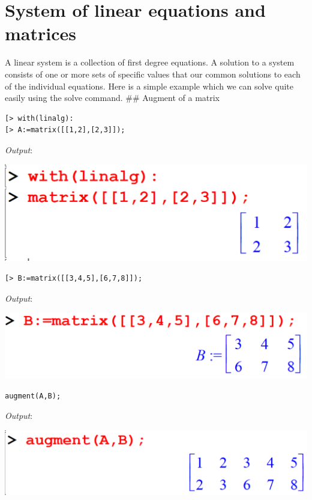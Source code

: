\documentclass[
]{book}
\theoremstyle{definition}
\theoremstyle{definition}
\theoremstyle{definition}
\theoremstyle{definition}
\theoremstyle{remark}
\begin{document}
\chapter{System of linear equations and matrices}\label{system-of-linear-equations-and-matrices}

A linear system is a collection of first degree equations. A solution to a system consists of one or more sets of specific values that our common solutions to each of the individual equations. Here is a simple example which we can solve quite easily using the solve command.
\#\# Augment of a matrix

\begin{verbatim}
[> with(linalg):
[> A:=matrix([[1,2],[2,3]]);
\end{verbatim}

\emph{Output}:

\includegraphics{figures/Lesson 5/fig1.png}

\begin{verbatim}
[> B:=matrix([[3,4,5],[6,7,8]]);
\end{verbatim}

\emph{Output}:

\includegraphics{figures/Lesson 5/fig2.png}

\begin{verbatim}
augment(A,B);
\end{verbatim}

\emph{Output}:

\includegraphics{figures/Lesson 5/fig3.png}
\end{document}
